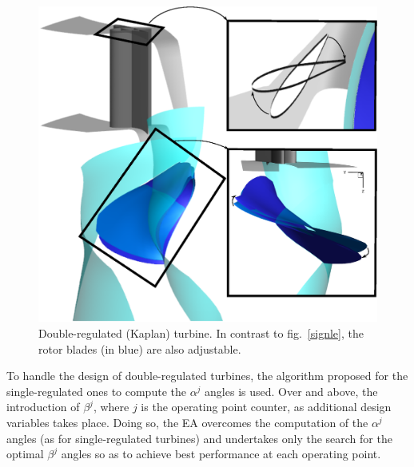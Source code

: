 \begin{figure}[h!]
\centering
\includegraphics[width=.8\textwidth]{DOUBLE.eps}
\caption{Double-regulated (Kaplan) turbine. In contrast to fig.\ \ref{signle}, the rotor blades (in blue) are also adjustable.}
\label{double}
\end{figure}

To handle the design of double-regulated turbines, the algorithm proposed for the single-regulated ones to compute the $\alpha^j$ angles is used. Over and above, the introduction of $\beta^j$, where $j$ is the operating point counter, as additional design variables takes place. Doing so, the EA overcomes the computation of the $\alpha^j$ angles (as for single-regulated turbines) and undertakes only the search for the optimal $\beta^j$ angles so as to achieve best performance at each operating point. %




 






